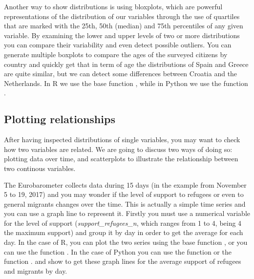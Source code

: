 Another way to show distributions is using bloxplots, which are powerful representations of the distribution of our variables through the use of quartiles that are marked with the 25th, 50th (median) and 75th percentiles of any given variable. By examining the lower and upper levels of two or more distributions you can compare their variability and even detect possible outliers. You can generate multiple boxplots to compare the ages of the surveyed citizens by country and quickly get that in term of age the distributions of Spain and Greece are quite similar, but we can detect some differences between Croatia and the Netherlands. In R we use the base function , while in Python we use the  function .





\subsection{Plotting relationships}

After having inspected distributions of single variables, you may want to check how two variables are related. We are going to discuss two ways of doing so: plotting data over time, and scatterplots to illustrate the relationship between two continous variables.

The Eurobarometer collects data during 15 days (in the example from November 5 to 19, 2017) and you may wonder if the level of support to refugees or even to general migrants changes over the time. This is actually a simple time series and you can use a graph line to represent it. Firstly you must use a numerical variable for the level of support (\emph{support\_refugees\_n}, which ranges from 1 to 4, being 4 the maximum support) and group it by day in order to get the average for each day. In the case of R, you can plot the two series using the base function , or you can use the  function . In the case of Python you can use the  function  or the  function . and  show to get these graph lines for the average support of refugees and migrants by day.




